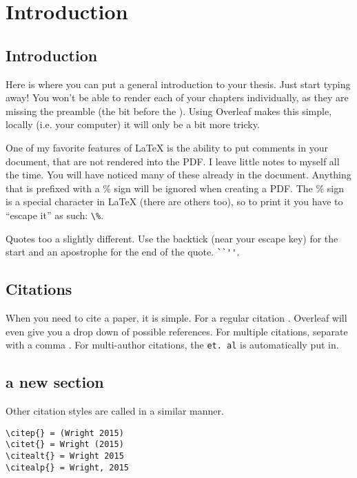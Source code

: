 
\chapter{Introduction} %

\label{Introduction} %

\section{Introduction}
Here is where you can put a general introduction to your thesis. Just start typing away! You won't be able to render each of your chapters individually, as they are missing the preamble (the bit before the \verb++). Using Overleaf makes this simple, locally (i.e. your computer) it will only be a bit more tricky. 

One of my favorite features of \LaTeX{} is the ability to put comments in your document, that are not rendered into the PDF. I leave little notes to myself all the time. You will have noticed many of these already in the document. Anything that is prefixed with a \% sign will be ignored when creating a PDF. The \% sign is a special character in \LaTeX{} (there are others too), so to print it you have to ``escape it'' as such: \verb+\%+.

Quotes too a slightly different. Use the backtick (near your escape key) for the start and an apostrophe for the end of the quote. \verb+``''+. 


\section{Citations}
When you need to cite a paper, it is simple. For a regular citation \citep{wright1932roles}. Overleaf will even give you a drop down of possible references. For multiple citations, separate with a comma \citep{wright1932roles,haldane1922sex}. For multi-author citations, the \verb+et. al+ is automatically put in.

\section{a new section}

Other citation styles are called in a similar manner.
\begin{verbatim}
\citep{} = (Wright 2015)
\citet{} = Wright (2015)
\citealt{} = Wright 2015
\citealp{} = Wright, 2015
\end{verbatim}


